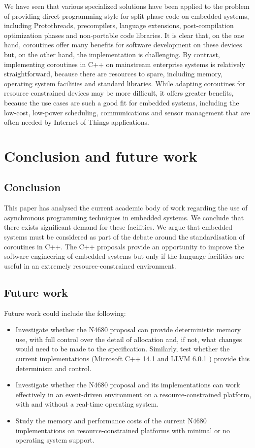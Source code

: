 We have seen that various specialized solutions have been applied to the problem of providing direct programming style for split-phase code on embedded systems, including Protothreads, precompilers, language extensions, post-compilation optimization phases and non-portable code libraries. It is clear that, on the one hand, coroutines offer many benefits for software development on these devices but, on the other hand, the implementation is challenging. By contrast, implementing coroutines in C++ on mainstream enterprise systems is relatively straightforward, because there are resources to spare, including memory, operating system facilities and standard libraries. While adapting coroutines for resource constrained devices may be more difficult, it offers greater benefits, because the use cases are such a good fit for embedded systems, including the low-cost, low-power scheduling, communications and sensor management that are often needed by Internet of Things applications.

\section{Conclusion and future work}
\label{section:conclusion}

\subsection{Conclusion}

This paper has analysed the current academic body of work regarding the use of asynchronous programming techniques in embedded systems. We conclude that there exists significant demand for these facilities. We argue that embedded systems must be considered as part of the debate around the standardisation of coroutines in C++. The C++ proposals provide an opportunity to improve the software engineering of embedded systems but only if the language facilities are useful in an extremely resource-constrained environment.

\subsection{Future work}

Future work could include the following:
\begin{itemize}
	\item Investigate whether the N4680 proposal can provide deterministic memory use, with full control over the detail of allocation and, if not, what changes would need to be made to the specification. Similarly, test whether the current implementations (Microsoft C++ 14.1 \cite{Microsoft2018} and LLVM 6.0.1 \cite{LLVMProject2018}) provide this determinism and control.
	\item Investigate whether the N4680 proposal and its implementations can work effectively in an event-driven environment on a resource-constrained platform, with and without a real-time operating system.
	\item Study the memory and performance costs of the current N4680 implementations on resource-constrained platforms with minimal or no operating system support.
\end{itemize}

